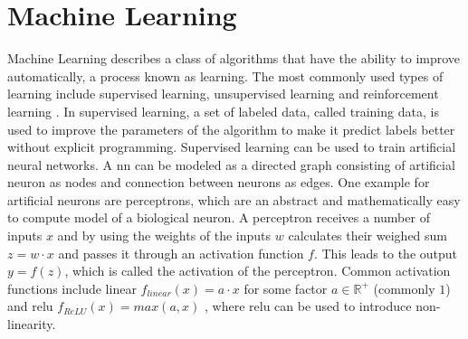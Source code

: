 \section{Machine Learning}
Machine Learning describes a class of algorithms that have the ability to improve automatically, a process known as learning. The most commonly used types of learning include supervised learning, unsupervised learning and reinforcement learning \cite{Dey2016}. In supervised learning, a set of labeled data, called training data, is used to improve the parameters of the algorithm to make it predict labels better without explicit programming. Supervised learning can be used to train artificial neural networks. A \ac{nn} can be modeled as a directed graph consisting of artificial neuron as nodes and connection between neurons as edges. One example for artificial neurons are perceptrons, which are an abstract and mathematically easy to compute model of a biological neuron. A perceptron receives a number of inputs $x$ and by using the weights of the inputs $w$ calculates their weighed sum $z=w \cdot x$ and passes it through an activation function $f$. This leads to the output
$y=f(z)$, which is called the activation of the perceptron. Common activation functions include linear $f_{linear}(x)=a \cdot x$ for some factor $a \in \mathbb{R^+}$ (commonly $1$) and \ac{relu} $f_{ReLU}(x)=max(a,x)$ \cite{Ramachandran2017}, where \ac{relu} can be used to introduce non-linearity.

